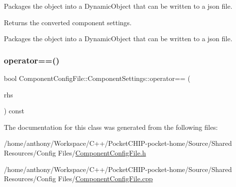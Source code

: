 Packages the object into a Dynamic\+Object that can be written to a json file.

\begin{DoxyReturn}{Returns}
the converted component settings.
\end{DoxyReturn}
Packages the object into a Dynamic\+Object that can be written to a json file. \mbox{\label{classComponentConfigFile_1_1ComponentSettings_a9c9d74155182454351e984bff97b490a}} 
\subsubsection{\texorpdfstring{operator==()}{operator==()}}
{\footnotesize\ttfamily bool Component\+Config\+File\+::\+Component\+Settings\+::operator== (\begin{DoxyParamCaption}\item[{const \mbox{\hyperlink{classComponentConfigFile_1_1ComponentSettings}{Component\+Settings}} \&}]{rhs }\end{DoxyParamCaption}) const}



The documentation for this class was generated from the following files\+:\begin{DoxyCompactItemize}
\item 
/home/anthony/\+Workspace/\+C++/\+Pocket\+C\+H\+I\+P-\/pocket-\/home/\+Source/\+Shared Resources/\+Config Files/\mbox{\hyperlink{ComponentConfigFile_8h}{Component\+Config\+File.\+h}}\item 
/home/anthony/\+Workspace/\+C++/\+Pocket\+C\+H\+I\+P-\/pocket-\/home/\+Source/\+Shared Resources/\+Config Files/\mbox{\hyperlink{ComponentConfigFile_8cpp}{Component\+Config\+File.\+cpp}}\end{DoxyCompactItemize}
